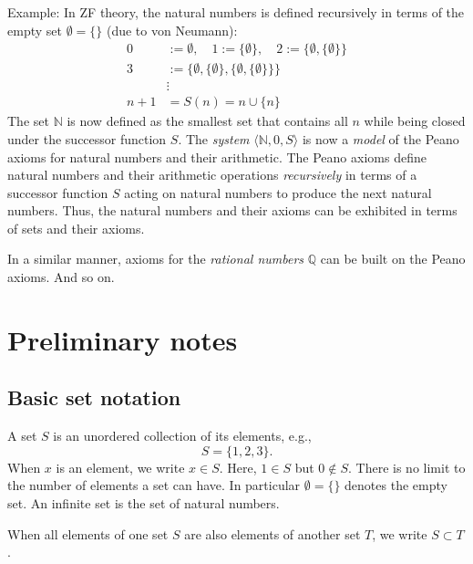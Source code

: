 Example: In ZF theory, the natural numbers is defined recursively in terms of the empty set $\emptyset = \{ \}$  (due to von Neumann):
\begin{align}
0 &:= \emptyset , \quad 1 := \{ \emptyset \}, \quad 2 :=  \{  \emptyset  ,  \{ \emptyset \} \} \\
3 &:=   \{ \emptyset,  \{ \emptyset \} ,  \{  \emptyset  ,  \{ \emptyset \} \} \}   \\    &\vdots \\
    n + 1 &= S(n)  =  n \cup \{n\} 
\end{align}
The set $\mathbb{N}$ is now defined as the smallest set that contains all $n$ while being closed under the successor function $S$. The \emph{system} $\langle\mathbb{N}, 0, S\rangle$ is now a \emph{model} of the Peano axioms for natural numbers and their arithmetic.  The Peano axioms define natural numbers and their arithmetic operations \emph{recursively} in terms of a successor function $S$ acting on natural numbers to produce the next natural numbers. Thus, the natural numbers and their axioms can be exhibited in terms of sets and their axioms.

In a similar manner, axioms for the \emph{rational numbers} $\mathbb{Q}$ can be built on the Peano axioms. And so on.


\section{Preliminary notes}

\subsection{Basic set notation}

A set $S$ is an unordered collection of its elements, e.g.,
\begin{equation}
    S = \{ 1, 2, 3 \}.
\end{equation}
When $x$ is an element, we write $x\in S$. Here, $1 \in S$ but $0 \notin S$. There is no limit to the number of elements a set can have. In particular $\emptyset = \{ \}$ denotes the empty set. An infinite set is the set of natural numbers.

When all elements of one set $S$ are also elements of another set $T$, we write $S \subset T$.

